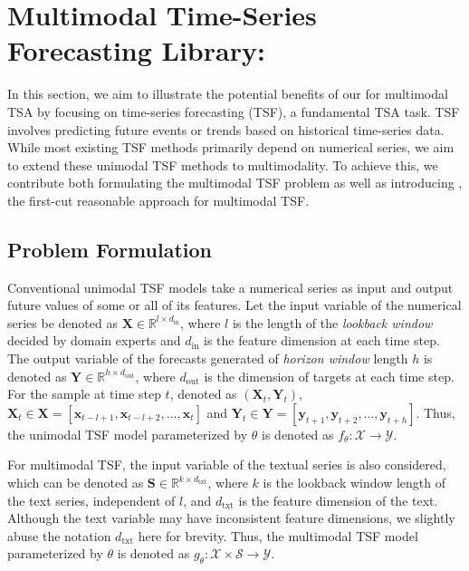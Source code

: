  \section{Multimodal Time-Series Forecasting Library: \mmtsf}\label{sec:lib}
In this section, we aim to illustrate the potential benefits of our \model for multimodal TSA by focusing on time-series forecasting (TSF), a fundamental TSA task. TSF involves predicting future events or trends based on historical time-series data. While most existing TSF methods primarily depend on numerical series, we aim to extend these unimodal TSF methods to multimodality. To achieve this, we contribute both formulating the multimodal TSF problem as well as introducing \mmtsf, the first-cut reasonable approach for multimodal TSF.

\subsection{Problem Formulation}


Conventional unimodal TSF models take a numerical series as input and output future values of some or all of its features. Let the input variable of the numerical series be denoted as $\bm{X}\in\mathbb{R}^{l\times d_\mathrm{in}}$, where $l$ is the length of the \textit{lookback window} decided by domain experts and $d_\mathrm{in}$ is the feature dimension at each time step. The output variable of the forecasts generated of \textit{horizon window} length $h$ is denoted as $\bm{Y}\in\mathbb{R}^{h\times d_\mathrm{out}}$, where $d_\mathrm{out}$ is the dimension of targets at each time step.  For the sample at time step $t$, denoted as $(\mathbf{X}_t,\mathbf{Y}_t)$, $\mathbf{X}_{t}\in\bm{X}=\left[\mathbf{x}_{t-l+1}, \mathbf{x}_{t-l+2}, \ldots, \mathbf{x}_{t}\right]$ and $\mathbf{Y}_{t}\in\bm{Y}=\left[\mathbf{y}_{t+1}, \mathbf{y}_{t+2}, \ldots, \mathbf{y}_{t+h}\right]$. Thus, the unimodal TSF model parameterized by $\theta$ is denoted as $f_\theta:\mathcal{X}\rightarrow\mathcal{Y}$.

For multimodal TSF, the input variable of the textual series is also considered, which can be denoted as $\bm{S} \in\mathbb{R}^{k\times d_\mathrm{txt}}$, where $k$ is the lookback window length of the text series, independent of $l$, and $d_\mathrm{txt}$ is the feature dimension of the text. Although the text variable may have inconsistent feature dimensions, we slightly abuse the notation $d_\mathrm{txt}$ here for brevity. Thus, the multimodal TSF model parameterized by $\theta$ is denoted as $g_\theta:\mathcal{X}\times\mathcal{S}\rightarrow\mathcal{Y}$.
